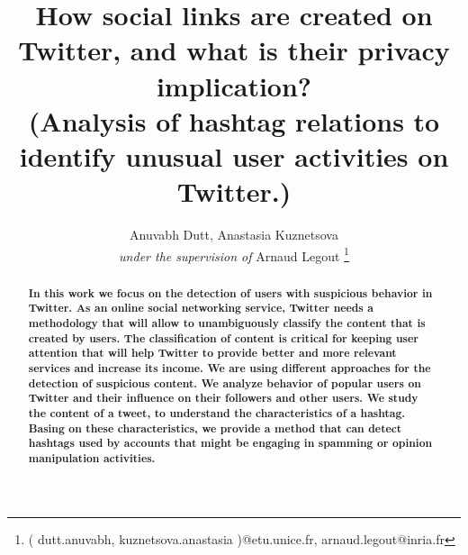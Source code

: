 \documentclass[journal, a4paper, 12pt]{article}
\begin{document}
      \title{How social links are created on Twitter, and what is their privacy implication?\\
    (Analysis of hashtag relations to identify unusual user activities on Twitter.)}
      \author{Anuvabh Dutt, Anastasia Kuznetsova \\ \textit{under the supervision of} Arnaud Legout
      \thanks{( dutt.anuvabh, kuznetsova.anastasia )@etu.unice.fr, arnaud.legout@inria.fr}
    }
    
    \date{}
    
      \maketitle

\begin{abstract}
\textbf{In this work we focus on the detection of users with suspicious behavior in Twitter. As an online social networking service, Twitter needs a methodology that will allow to unambiguously classify the content that is created by users. The classification of content is critical for keeping user attention that will help Twitter to provide better and more relevant services and increase its income. We are using different approaches for the detection of suspicious content. We analyze behavior of popular users on Twitter and their influence on their followers and other users. We study the content of a tweet, to understand the characteristics of a hashtag. Basing on these characteristics, we provide a method that can detect hashtags used by accounts that might be engaging in spamming or opinion manipulation activities.}
\end{abstract}
\vspace*{\fill}
\pagebreak

\end{document}
